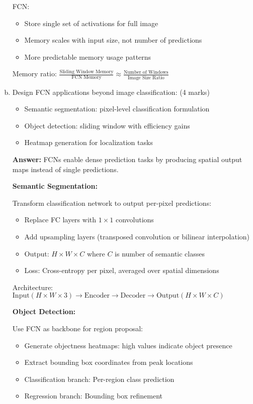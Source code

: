 \documentclass[12pt]{article}
\newcommand{\answer}[1]{{\color{answercolor}\textbf{Answer:} #1}}
\newcommand{\explanation}[1]{{\color{explanationcolor}#1}}
\begin{document}
\begin{enumerate}[(a)]
{    FCN:
    \begin{itemize}
        \item Store single set of activations for full image
        \item Memory scales with input size, not number of predictions
        \item More predictable memory usage patterns
    \end{itemize}
    
    Memory ratio: $\frac{\text{Sliding Window Memory}}{\text{FCN Memory}} \approx \frac{\text{Number of Windows}}{\text{Image Size Ratio}}$
    }
    
    \item Design FCN applications beyond image classification: \hfill (4 marks)
    \begin{itemize}
        \item Semantic segmentation: pixel-level classification formulation
        \item Object detection: sliding window with efficiency gains
        \item Heatmap generation for localization tasks
    \end{itemize}
    
    \answer{FCNs enable dense prediction tasks by producing spatial output maps instead of single predictions.}
    
    \explanation{
    \textbf{Semantic Segmentation:}
    
    Transform classification network to output per-pixel predictions:
    \begin{itemize}
        \item Replace FC layers with $1 \times 1$ convolutions
        \item Add upsampling layers (transposed convolution or bilinear interpolation)
        \item Output: $H \times W \times C$ where $C$ is number of semantic classes
        \item Loss: Cross-entropy per pixel, averaged over spatial dimensions
    \end{itemize}
    
    Architecture: $\text{Input}(H \times W \times 3) \rightarrow \text{Encoder} \rightarrow \text{Decoder} \rightarrow \text{Output}(H \times W \times C)$
    
    \textbf{Object Detection:}
    
    Use FCN as backbone for region proposal:
    \begin{itemize}
        \item Generate objectness heatmaps: high values indicate object presence
        \item Extract bounding box coordinates from peak locations
        \item Classification branch: Per-region class prediction
        \item Regression branch: Bounding box refinement
    \end{itemize}
    
}
\end{enumerate}
\end{document}
